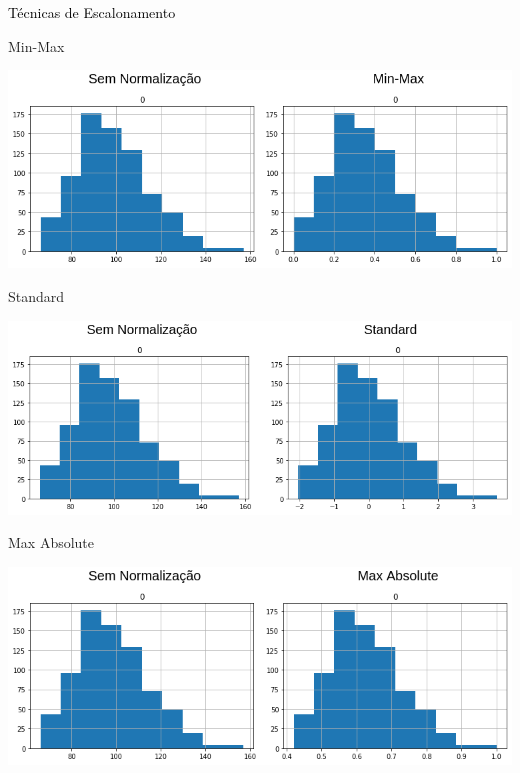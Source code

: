 \begin{transitionframe}
	\begin{center}
		{ \Huge \textcolor{black}{Técnicas de Escalonamento}}
	\end{center}
\end{transitionframe}

\begin{frame}{Min-Max}
\begin{center}
	\includegraphics[width=.9\textwidth,height=.7\textheight]{./fig/sem_min_max.png}
\end{center}
\end{frame}

\begin{frame}{Standard}
\begin{center}
	\includegraphics[width=.9\textwidth,height=.7\textheight]{./fig/sem_std.png}
\end{center}
\end{frame}

\begin{frame}{Max Absolute}
\begin{center}
	\includegraphics[width=.9\textwidth,height=.7\textheight]{./fig/sem_max_abs.png}
\end{center}
\end{frame}

